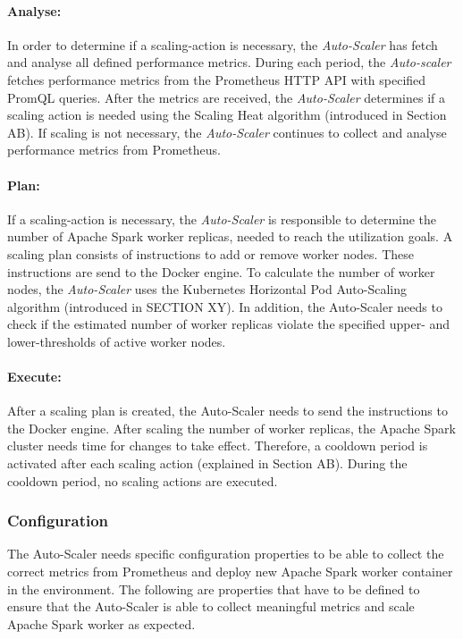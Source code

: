 \paragraph{Analyse:}
In order to determine if a scaling-action is necessary, the \textit{Auto-Scaler} has fetch and analyse all defined performance metrics. 
During each period, the \textit{Auto-scaler} fetches performance metrics from the Prometheus HTTP API with specified PromQL queries.
After the metrics are received, the \textit{Auto-Scaler} determines if a scaling action is needed using the Scaling Heat algorithm (introduced in Section AB). If scaling is not necessary, the \textit{Auto-Scaler} continues to collect and analyse performance metrics from Prometheus.

\paragraph{Plan:}
If a scaling-action is necessary, the \textit{Auto-Scaler} is responsible to determine the number of Apache Spark worker replicas, needed to reach the utilization goals.
A scaling plan consists of instructions to add or remove worker nodes. These instructions are send to the Docker engine.
To calculate the number of worker nodes, the \textit{Auto-Scaler} uses the Kubernetes Horizontal Pod Auto-Scaling algorithm (introduced in SECTION XY).
In addition, the Auto-Scaler needs to check if the estimated number of worker replicas violate the specified upper- and lower-thresholds of active worker nodes.

\paragraph{Execute:}
After a scaling plan is created, the Auto-Scaler needs to send the instructions to the Docker engine.
After scaling the number of worker replicas, the Apache Spark cluster needs time for changes to take effect. Therefore, a cooldown period is activated after each scaling action (explained in Section AB).
During the cooldown period, no scaling actions are executed.


\subsubsection{Configuration}
\label{subsubsec:05_am_auto-scaler_config}
The Auto-Scaler needs specific configuration properties to be able to collect the correct metrics from Prometheus and deploy new Apache Spark worker container in the environment. The following are properties that have to be defined to ensure that the Auto-Scaler is able to collect meaningful metrics and scale Apache Spark worker as expected.

